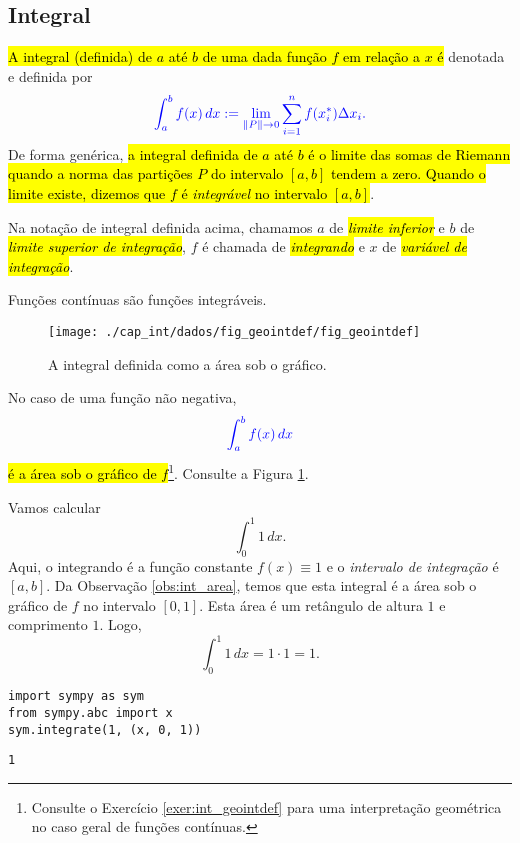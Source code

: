 \subsection{Integral}

\hl{A integral (definida) de $a$ até $b$ de uma dada função $f$ em relação a $x$ é} denotada e definida por
\begin{equation}\color{blue}\int_a^b f(x)\,dx := \lim_{\|P\|\to 0} \sum_{i=1}^n f(x_i^*)\Delta x_i.
\end{equation}
De forma genérica, \hl{a integral definida de $a$ até $b$ é o limite das somas de Riemann quando a norma das partições $P$ do intervalo $[a, b]$ tendem a zero. Quando o limite existe, dizemos que $f$ é \emph{integrável} no intervalo $[a, b]$}.

Na notação de integral definida acima, chamamos $a$ de \hl{\emph{limite inferior}} e $b$ de \hl{\emph{limite superior de integração}}, $f$ é chamada de \hl{\emph{integrando}} e $x$ de \hl{\emph{variável de integração}}.

\begin{obs}
  Funções contínuas são funções integráveis.
\end{obs}

\begin{figure}[H]
  \centering
  \texttt{[image: ./cap\_int/dados/fig\_geointdef/fig\_geointdef]}
  \caption{A integral definida como a área sob o gráfico.}
  \label{fig:geointdef}
\end{figure}

\begin{obs}\label{obs:int_area}
  No caso de uma função não negativa,
  \begin{equation}\color{blue}\int_a^b f(x)\,dx
  \end{equation}
  \hl{é a área sob o gráfico de $f$}\footnote{Consulte o Exercício \ref{exer:int_geointdef} para uma interpretação geométrica no caso geral de funções contínuas.}. Consulte a Figura \ref{fig:geointdef}.  
\end{obs}

\begin{ex}
  Vamos calcular
  \begin{equation}
    \int_0^1 1\,dx.
  \end{equation}
  Aqui, o integrando é a função constante $f(x) \equiv 1$ e o \emph{intervalo de integração} é $[a, b]$. Da Observação \ref{obs:int_area}, temos que esta integral é a área sob o gráfico de $f$ no intervalo $[0, 1]$. Esta área é um retângulo de altura $1$ e comprimento $1$. Logo,
  \begin{equation}
    \int_0^1 1\,dx = 1\cdot 1 = 1.
  \end{equation}

\begin{lstlisting}
import sympy as sym
from sympy.abc import x
sym.integrate(1, (x, 0, 1))
\end{lstlisting}

\begin{verbatim}
1
\end{verbatim}

\end{ex}

